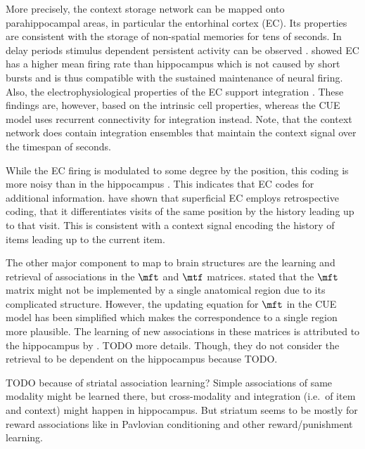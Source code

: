 More precisely, the context storage network can be mapped  onto parahippocampal areas, in particular the entorhinal cortex (EC).
Its properties are consistent with the storage of non-spatial memories for tens of seconds.
In delay periods stimulus dependent persistent activity can be observed \parencite{suzuki1997,young1997}.
\Textcite{quirk1992} showed EC has a higher mean firing rate than hippocampus which is not caused by short bursts and is thus compatible with the sustained maintenance of neural firing.
Also, the electrophysiological properties of the EC support integration \parencite{egorov2002}.
These findings are, however, based on the intrinsic cell properties, whereas the CUE model uses recurrent connectivity for integration instead.
Note, that the context network does contain integration ensembles that maintain the context signal over the timespan of seconds.

While the EC firing is modulated to some degree by the position, this coding is more noisy than in the hippocampus \parencite{quirk1992}.
This indicates that EC codes for additional information.
\Textcite{Frank2000} have shown that superficial EC employs retrospective coding, that it differentiates visits of the same position by the history leading up to that visit.
This is consistent with a context signal encoding the history of items leading up to the current item.

The other major component to map to brain structures are the learning and retrieval of associations in the $\mft$ and $\mtf$ matrices.
\Textcite{howard2005} stated that the $\mft$ matrix might not be implemented by a single anatomical region due to its complicated structure.
However, the updating equation for $\mft$ in the CUE model has been simplified which makes the correspondence to a single region more plausible.
The learning of new associations in these matrices is attributed to the hippocampus by \textcite{howard2005}.
TODO more details.
Though, they do not consider the retrieval to be dependent on the hippocampus because TODO\@.

TODO because of striatal association learning?
Simple associations of same modality might be learned there, but cross-modality and integration (i.e.\ of item and context) might happen in hippocampus.
But striatum seems to be mostly for reward associations like in Pavlovian conditioning and other reward/punishment learning.

